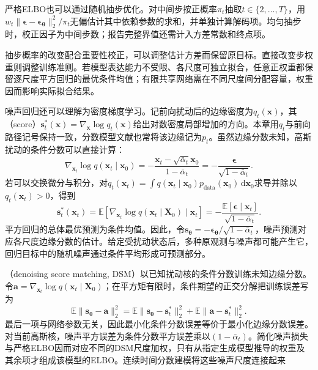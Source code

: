 严格ELBO也可以通过随机抽步优化。对中间步按正概率$\pi_t$抽取$t\in\{2,\ldots,T\}$，用$w_t\lVert\bm{\epsilon}-\bm{\epsilon}_{\bm{\theta}}\rVert_2^2/\pi_t$无偏估计其中依赖参数的求和，并单独计算解码项。均匀抽步时，校正因子为中间步数；报告完整界值还需计入方差常数和终点项。

抽步概率的改变配合重要性校正，可以调整估计方差而保留原目标。直接改变步权重则调整训练准则。若模型表达能力不受限、各尺度可独立拟合，任意正权重都保留逐尺度平方回归的最优条件均值；有限共享网络需在不同尺度间分配容量，权重因而影响实际拟合结果。

噪声回归还可以理解为密度梯度学习。记前向扰动后的边缘密度为$q_t(\bm{x})$，其（score）$\bm{s}_t^*(\bm{x})=\nabla_{\bm{x}}\log q_t(\bm{x})$给出对数密度局部增加的方向。本章用$q_t$与前向路径记号保持一致，分数模型文献也常将该边缘记为$p_t$。虽然边缘分数未知，高斯扰动的条件分数可以直接计算：
\[
  \nabla_{\bm{x}_t}\log q(\bm{x}_t\mid\bm{x}_0)
  =-\frac{\bm{x}_t-\sqrt{\bar{\alpha}_t}\bm{x}_0}
           {1-\bar{\alpha}_t}
  =-\frac{\bm{\epsilon}}{\sqrt{1-\bar{\alpha}_t}}.
\]
若可以交换微分与积分，对$q_t(\bm{x}_t)=\int q(\bm{x}_t\mid\bm{x}_0)p_{\mathrm{data}}(\bm{x}_0)\,\mathrm{d}\bm{x}_0$求导并除以$q_t(\bm{x}_t)>0$，得到
\begin{equation}
  \label{eq:pgm-generative-denoising-identity}
  \bm{s}_t^*(\bm{x}_t)
  =\mathbb{E}\!\left[
       \nabla_{\bm{x}_t}\log q(\bm{x}_t\mid\bm{X}_0)
       \mid\bm{x}_t\right]
  =-\frac{\mathbb{E}[\bm{\epsilon}\mid\bm{x}_t]}
            {\sqrt{1-\bar{\alpha}_t}}.
\end{equation}
平方回归的总体最优预测为条件均值。因此，令$\bm{s}_{\bm{\theta}}=-\bm{\epsilon}_{\bm{\theta}}/\sqrt{1-\bar{\alpha}_t}$，噪声预测对应各尺度边缘分数的估计。给定受扰动状态后，多种原观测与噪声都可能产生它，回归目标中的随机噪声通过条件平均形成可预测部分。

（denoising score matching, DSM）以已知扰动核的条件分数训练未知边缘分数。令$\bm{a}=\nabla_{\bm{x}_t}\log q(\bm{x}_t\mid\bm{X}_0)$；在平方矩有限时，条件期望的正交分解把训练误差写为
\begin{equation}
  \label{eq:pgm-generative-dsm-decomposition}
  \mathbb{E}\lVert\bm{s}_{\bm{\theta}}-\bm{a}\rVert_2^2
  =\mathbb{E}\lVert\bm{s}_{\bm{\theta}}-\bm{s}_t^*\rVert_2^2
   +\mathbb{E}\lVert\bm{a}-\bm{s}_t^*\rVert_2^2.
\end{equation}
最后一项与网络参数无关，因此最小化条件分数误差等价于最小化边缘分数误差。对当前高斯核，噪声平方误差为条件分数平方误差乘以$(1-\bar{\alpha}_t)$。简化噪声损失与严格ELBO因而对应不同的DSM尺度加权，只有从指定生成模型推导的权重及其余项才组成该模型的ELBO。连续时间分数建模将这些噪声尺度连接起来

